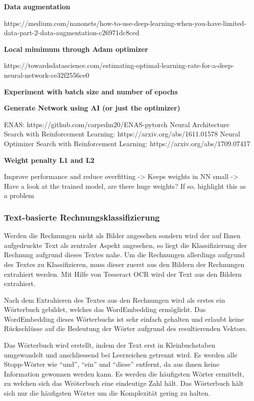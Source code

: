 \textbf{Data augmentation}

https://medium.com/nanonets/how-to-use-deep-learning-when-you-have-limited-data-part-2-data-augmentation-c26971dc8ced


\textbf{Local mimimum through Adam optimizer}

https://towardsdatascience.com/estimating-optimal-learning-rate-for-a-deep-neural-network-ce32f2556ce0


\textbf{Experiment with batch size and number of epochs}

\textbf{Generate Network using AI (or just the optimizer)}

ENAS: https://github.com/carpedm20/ENAS-pytorch
Neural Architecture Search with Reinforcement Learning: https://arxiv.org/abs/1611.01578
Neural Optimizer Search with Reinforcement Learning: https://arxiv.org/abs/1709.07417

\textbf{Weight penalty L1 and L2}

Improve performance and reduce overfitting -> Keeps weights in NN small
-> Have a look at the trained model, are there huge weights? If so, highlight this as a problem




\subsubsection{Text-basierte Rechnungsklassifizierung}
\label{chap:text-based-classification}

Werden die Rechnungen nicht als Bilder angesehen sondern wird der auf Ihnen aufgedruckte Text als zentraler Aspekt angesehen, so liegt die Klassifizierung der Rechnung aufgrund dieses Textes nahe. Um die Rechnungen allerdings aufgrund des Textes zu Klassifizieren, muss dieser zuerst aus den Bildern der Rechnungen extrahiert werden. Mit Hilfe von Tesseract OCR wird der Text aus den Bildern extrahiert.

Nach dem Extrahieren des Textes aus den Rechnungen wird als erstes ein Wörterbuch gebildet, welches das WordEmbedding  ermöglicht. Das WordEmbedding dieses Wörterbuchs ist sehr einfach gehalten und erlaubt keine Rückschlüsse auf die Bedeutung der Wörter aufgrund des resultierenden Vektors.

Das Wörterbuch wird erstellt, indem der Text erst in Kleinbuchstaben umgewandelt und anschliessend bei Leerzeichen getrennt wird. Es werden alle Stopp-Wörter wie \enquote{und}, \enquote{ein} und \enquote{diese} entfernt, da aus ihnen keine Information gewonnen werden kann. Es werden die häufigsten Wörter ermittelt, zu welchen sich das Wröterbuch eine eindeutige Zahl hält. Das Wörterbuch hält sich nur die häufigsten Wörter um die Komplexität gering zu halten.

